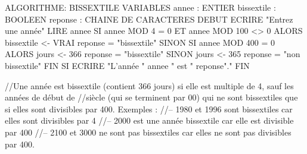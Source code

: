 ALGORITHME: BISSEXTILE
VARIABLES annee : ENTIER
            bissextile : BOOLEEN
            reponse : CHAINE DE CARACTERES
DEBUT
    ECRIRE "Entrez une année"
    LIRE annee
    SI annee MOD 4 = 0 ET annee MOD 100 <> 0 ALORS
        bissextile <- VRAI
        reponse = "bissextile"
    SINON
    SI annee MOD 400 = 0 ALORS
        jours <- 366
        reponse = "bissextile"
    SINON
        jours <- 365
        reponse = "non bissextile"
    FIN SI
    ECRIRE "L'année " annee " est " reponse"."
FIN


//Une année est bissextile (contient 366 jours) si elle est multiple de 4, sauf les années de début de
//siècle (qui se terminent par 00) qui ne sont bissextiles que si elles sont divisibles par 400. Exemples :
//– 1980 et 1996 sont bissextiles car elles sont divisibles par 4
//– 2000 est une année bissextile car elle est divisible par 400
//– 2100 et 3000 ne sont pas bissextiles car elles ne sont pas divisibles par 400.